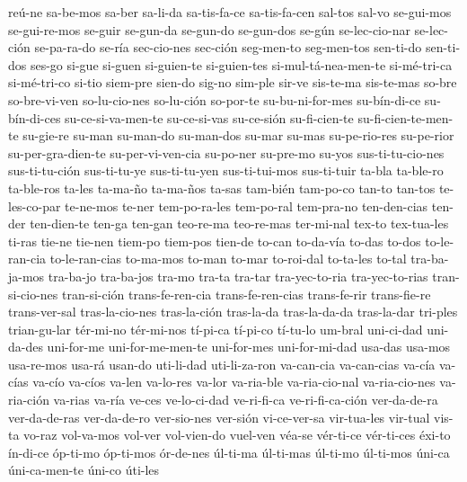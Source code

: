 {reú-ne sa-be-mos sa-ber sa-li-da sa-tis-fa-ce sa-tis-fa-cen sal-tos sal-vo se-gui-mos
se-gui-re-mos se-guir se-gun-da se-gun-do se-gun-dos se-gún se-lec-cio-nar se-lec-ción
se-pa-ra-do se-ría sec-cio-nes sec-ción seg-men-to seg-men-tos sen-ti-do sen-ti-dos ses-go
si-gue si-guen si-guien-te si-guien-tes si-mul-tá-nea-men-te si-mé-tri-ca si-mé-tri-co
si-tio siem-pre sien-do sig-no sim-ple sir-ve sis-te-ma sis-te-mas so-bre so-bre-vi-ven
so-lu-cio-nes so-lu-ción so-por-te su-bu-ni-for-mes su-bín-di-ce su-bín-di-ces
su-ce-si-va-men-te su-ce-si-vas su-ce-sión su-fi-cien-te su-fi-cien-te-men-te su-gie-re
su-man su-man-do su-man-dos su-mar su-mas su-pe-rio-res su-pe-rior su-per-gra-dien-te
su-per-vi-ven-cia su-po-ner su-pre-mo su-yos sus-ti-tu-cio-nes sus-ti-tu-ción sus-ti-tu-ye
sus-ti-tu-yen sus-ti-tui-mos sus-ti-tuir ta-bla ta-ble-ro ta-ble-ros ta-les ta-ma-ño
ta-ma-ños ta-sas tam-bién tam-po-co tan-to tan-tos te-les-co-par te-ne-mos te-ner
tem-po-ra-les tem-po-ral tem-pra-no ten-den-cias ten-der ten-dien-te ten-ga ten-gan
teo-re-ma teo-re-mas ter-mi-nal tex-to tex-tua-les ti-ras tie-ne tie-nen tiem-po tiem-pos
tien-de to-can to-da-vía to-das to-dos to-le-ran-cia to-le-ran-cias to-ma-mos to-man to-mar
to-roi-dal to-ta-les to-tal tra-ba-ja-mos tra-ba-jo tra-ba-jos tra-mo tra-ta tra-tar
tra-yec-to-ria tra-yec-to-rias tran-si-cio-nes tran-si-ción trans-fe-ren-cia
trans-fe-ren-cias trans-fe-rir trans-fie-re trans-ver-sal tras-la-cio-nes tras-la-ción
tras-la-da tras-la-da-da tras-la-dar tri-ples trian-gu-lar tér-mi-no tér-mi-nos tí-pi-ca
tí-pi-co tí-tu-lo um-bral uni-ci-dad uni-da-des uni-for-me uni-for-me-men-te uni-for-mes
uni-for-mi-dad usa-das usa-mos usa-re-mos usa-rá usan-do uti-li-dad uti-li-za-ron va-can-cia
va-can-cias va-cía va-cías va-cío va-cíos va-len va-lo-res va-lor va-ria-ble va-ria-cio-nal
va-ria-cio-nes va-ria-ción va-rias va-ría ve-ces ve-lo-ci-dad ve-ri-fi-ca ve-ri-fi-ca-ción
ver-da-de-ra ver-da-de-ras ver-da-de-ro ver-sio-nes ver-sión vi-ce-ver-sa vir-tua-les
vir-tual vis-ta vo-raz vol-va-mos vol-ver vol-vien-do vuel-ven véa-se vér-ti-ce vér-ti-ces
éxi-to ín-di-ce óp-ti-mo óp-ti-mos ór-de-nes úl-ti-ma úl-ti-mas úl-ti-mo úl-ti-mos úni-ca
úni-ca-men-te úni-co úti-les
}
